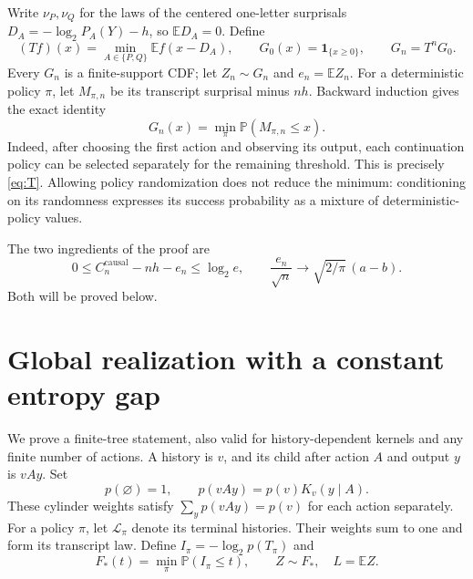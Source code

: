 \documentclass[11pt,a4paper]{article}
\newcommand{\E}{\mathbb E}
\newcommand{\Prob}{\mathbb P}
\newcommand{\causal}{\mathrm{causal}}
\begin{document}
Write $\nu_P,\nu_Q$ for the laws of the centered one-letter surprisals
$D_A=-\log_2P_A(Y)-h$, so $\E D_A=0$. Define
\begin{equation}\label{eq:T}
(Tf)(x)=\min_{A\in\{P,Q\}}\E f(x-D_A),\qquad
G_0(x)=\mathbf1_{\{x\ge0\}},\qquad G_n=T^nG_0.
\end{equation}
Every $G_n$ is a finite-support CDF; let $Z_n\sim G_n$ and $e_n=\E Z_n$.
For a deterministic policy $\pi$, let $M_{\pi,n}$ be its transcript
surprisal minus $nh$. Backward induction gives the exact identity
\begin{equation}\label{eq:policy}
G_n(x)=\min_\pi\Prob(M_{\pi,n}\le x).
\end{equation}
Indeed, after choosing the first action and observing its output, each
continuation policy can be selected separately for the remaining
threshold. This is precisely \eqref{eq:T}. Allowing policy randomization
does not reduce the minimum: conditioning on its randomness expresses
its success probability as a mixture of deterministic-policy values.

The two ingredients of the proof are
\begin{equation}\label{eq:twoingredients}
0\le C_n^{\causal}-nh-e_n\le\log_2e,
\qquad
\frac{e_n}{\sqrt n}\longrightarrow\sqrt{2/\pi}\,(a-b).
\end{equation}
Both will be proved below.

\section{Global realization with a constant entropy gap}
We prove a finite-tree statement, also valid for history-dependent
kernels and any finite number of actions. A history is $v$, and its
child after action $A$ and output $y$ is $vAy$. Set
\[
p(\varnothing)=1,\qquad p(vAy)=p(v)K_v(y\mid A).
\]
These cylinder weights satisfy
$\sum_y p(vAy)=p(v)$ for each action separately. For a policy $\pi$,
let $\mathcal L_\pi$ denote its terminal histories. Their weights sum
to one and form its transcript law. Define $I_\pi=-\log_2p(T_\pi)$ and
\[
F_*(t)=\min_\pi\Prob(I_\pi\le t),\qquad Z\sim F_*,\quad L=\E Z.
\]
\end{document}
